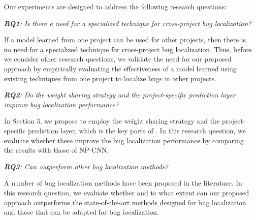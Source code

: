 
Our experiments are designed to address the following research questions:

\vspace{0.2cm}\noindent\textit{\textbf{RQ1}: Is there a need for a specialized technique for cross-project bug localization?}

If a model learned from one project can be used for other projects, then there is no need for a specialized technique for cross-project bug localization. Thus, before we consider other research questions, we validate the need for our proposed approach by empirically evaluating the effectiveness of a model learned using existing techniques from one project to localize bugs in other projects.

\vspace{0.2cm}\noindent\textit{\textbf{RQ2}: Do the weight sharing strategy and the project-specific prediction layer improve bug localization performance?}


In Section 3, we propose to employ the weight sharing strategy and the project-specific prediction layer, which is the key parts of \TRANPCNN. In this research question, we evaluate whether these improve the bug localization performance by comparing the results with those of NP-CNN.

\vspace{0.2cm}\noindent\textit{\textbf{RQ3}: Can \TRANPCNN outperform other bug localization methods?}

A number of bug localization methods have been proposed in the literature. In this research question, we evaluate whether and to what extent can our proposed approach \TRANPCNN outperforms the state-of-the-art methods designed for bug localization and those that can be adapted for bug localization. 